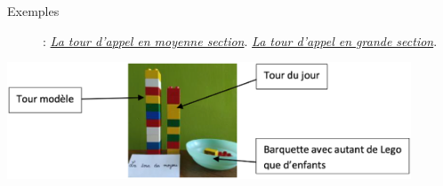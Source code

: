 \begin{exercice*}
\begin{description}
      \item[Exemples] : \href{https://www.youtube.com/watch?v=1W5twrzjv5I}{\it\blue La tour d'appel en moyenne section}. \href{https://www.youtube.com/watch?v=7quHGbemeiM&t=61s}{\it\blue La tour d'appel en grande section}.
   \end{description}
   \begin{center}
   \includegraphics[width=12cm]{Nombres_et_calculs_did/Images/Num2_activites_tour_appel}
\end{center}
\end{exercice*}


